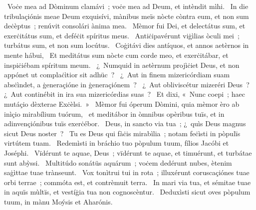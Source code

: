 ~Voċe mea ad Dòminum clamávi~; voċe mea ad Deum, et intèndit mìhi. 
~In die tribulaçiónis meae Deum exquisívi, mànibus meïs nòcte còntra eum, et non sum deċèptus~; renúvit consolári ànima mea. 
~Mèmor fui Dei, et delectátus sum, et exerċitátus sum, et deféċit spíritus meus. 
~Antiċipavérunt viġìlias òculi mei~; turbátus sum, et non sum locútus. 
~Coġitávi dies antíquos, et annos aetèrnos in mente hábui, 
~Et meditátus sum nòcte cum corde meo, et exerċitábar, et inspiċiébam spíritum meum. 
~¿~Numquid in aetèrnum projìċiet Deus, et non appónet ut complaċìtior sit adhüc~? 
~¿~Aut in finem mizericórdiam suam absċìndet, a ġeneraçióne in ġeneraçiónem~? 
~¿~Aut obliviscétur mizeréri Deus~? ¿~Aut continébit in ira sua mizericórdias suas~? 
~Et dixi, «~Nunc coepi~; haec mutáçio dèxterae Exċèlsi.~»
~Mèmor fui óperum Dòmini, quia mèmor èro ab inìçio mirabílium tuórum, 
~et meditábor in òmnibus opèribus tuïs, et in adinvençiónibus tuïs exerċébor. 
~Deus, in sancto via tua~; ¿~quìs Deus magnus sicut Deus noster~? 
~Tu es Deus qui fàċis mirabìlia~; notam feċìsti in pòpulïs virtútem tuam. 
~Redemìsti in bráchio tuo pòpulum tuum, fílios Jacóbi et Joséphi. 
~Vïdérunt te aquae, Deus~; vïdérunt te aquae, et timuérunt, et turbátae sunt abỳssi. 
~Multitúdo sonátüs aquárum~; voċem dedérunt nubes, ètenim saġìttae tuae trànseunt. 
~Vox tonìtrui tui in rota~; illuxérunt coruscaçiónes tuae orbi terrae~; commóta est, et contrèmuit terra. 
~In mari via tua, et sémitae tuae in aquïs mùltïs, et vestíġia tua non cognoscèntur. 
~Deduxìsti sicut oves pòpulum tuum, in mànu Moýsis et Aharónis. 
